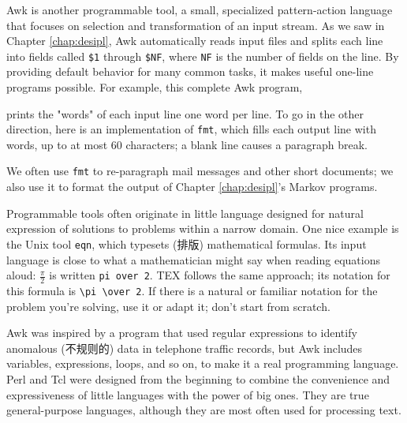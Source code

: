 Awk is another programmable tool, a small, specialized pattern-action
language that focuses on selection and transformation of an input stream.
As we saw in Chapter \ref{chap:desipl}, Awk automatically reads input files
and splits each line into fields called \verb'$1' through \verb'$NF', where
\verb'NF' is the number of fields on the line. By providing default
behavior for many common tasks, it makes useful one-line programs possible.
For example, this complete Awk program,
prints the "words" of each input line one word per line. To go in the other
direction, here is an implementation of \verb'fmt', which fills each output
line with words, up to at most 60 characters; a blank line causes a
paragraph break.
We often use \verb'fmt' to re-paragraph mail messages and other short
documents; we also use it to format the output of Chapter
\ref{chap:desipl}'s Markov programs.

Programmable tools often originate in little language designed for natural
expression of solutions to problems within a narrow domain. One nice
example is the Unix tool \verb'eqn', which typesets (排版) mathematical
formulas. Its input language is close to what a mathematician might say
when reading equations aloud: $\frac{\pi}{2}$ is written \verb'pi over 2'.
TEX follows the same approach; its notation for this formula is
\verb'\pi \over 2'. If there is a natural or familiar notation for the
problem you're solving, use it or adapt it; don't start from scratch.

Awk was inspired by a program that used regular expressions to identify
anomalous (不规则的) data in telephone traffic records, but Awk includes
variables, expressions, loops, and so on, to make it a real programming
language. Perl and Tcl were designed from the beginning to combine the
convenience and expressiveness of little languages with the power of big
ones. They are true general-purpose languages, although they are most often
used for processing text.

